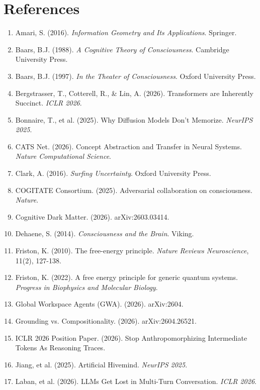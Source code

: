\documentclass[11pt,a4paper]{article}
\theoremstyle{definition}
\theoremstyle{remark}
\begin{document}
\newpage
\section*{References}

\begin{enumerate}
    \item Amari, S. (2016). \textit{Information Geometry and Its Applications}. Springer.
    \item Baars, B.J. (1988). \textit{A Cognitive Theory of Consciousness}. Cambridge University Press.
    \item Baars, B.J. (1997). \textit{In the Theater of Consciousness}. Oxford University Press.
    \item Bergstrasser, T., Cotterell, R., \& Lin, A. (2026). Transformers are Inherently Succinct. \textit{ICLR 2026}.
    \item Bonnaire, T., et al. (2025). Why Diffusion Models Don't Memorize. \textit{NeurIPS 2025}.
    \item CATS Net. (2026). Concept Abstraction and Transfer in Neural Systems. \textit{Nature Computational Science}.
    \item Clark, A. (2016). \textit{Surfing Uncertainty}. Oxford University Press.
    \item COGITATE Consortium. (2025). Adversarial collaboration on consciousness. \textit{Nature}.
    \item Cognitive Dark Matter. (2026). arXiv:2603.03414.
    \item Dehaene, S. (2014). \textit{Consciousness and the Brain}. Viking.
    \item Friston, K. (2010). The free-energy principle. \textit{Nature Reviews Neuroscience}, 11(2), 127-138.
    \item Friston, K. (2022). A free energy principle for generic quantum systems. \textit{Progress in Biophysics and Molecular Biology}.
    \item Global Workspace Agents (GWA). (2026). arXiv:2604.
    \item Grounding vs. Compositionality. (2026). arXiv:2604.26521.
    \item ICLR 2026 Position Paper. (2026). Stop Anthropomorphizing Intermediate Tokens As Reasoning Traces.
    \item Jiang, et al. (2025). Artificial Hivemind. \textit{NeurIPS 2025}.
    \item Laban, et al. (2026). LLMs Get Lost in Multi-Turn Conversation. \textit{ICLR 2026}.

\end{enumerate}
\end{document}
